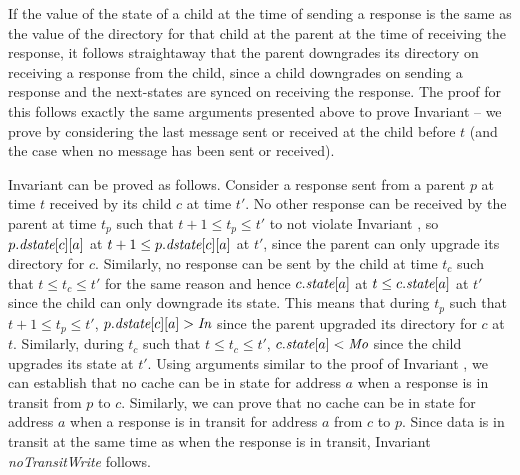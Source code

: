 If the value of the state of a child at the time of sending a response is the
same as the value of the directory for that child at the parent at the time of
receiving the response, it follows straightaway that the parent downgrades its
directory on receiving a response from the child, since a child downgrades on
sending a response and the next-states are synced on receiving the response.
The proof for this follows exactly the same arguments presented above to prove
Invariant  -- we prove by considering the last message
sent or received at the child before $t$ (and the case when no message has been
sent or received).

Invariant  can be proved as follows. Consider a response
sent from a parent $p$ at time $t$ received by its child $c$ at time $t'$. No
other response can be received by the parent at time $t_p$ such that $t+1 \le
t_p \le t'$ to not violate Invariant , so $p.\textit{dstate}[c][a]$ at
$t+1 \le p.\textit{dstate}[c][a]$ at $t'$, since the parent can only upgrade its
directory for $c$. Similarly, no response can be sent by the child at time
$t_c$ such that $t \le t_c \le t'$ for the same reason and hence $c.\textit{state}[a]$
at $t \le c.\textit{state}[a]$ at $t'$ since the child can only downgrade its state.
This means that during $t_p$ such that $t+1 \le t_p \le t'$, $p.\textit{dstate}[c][a]
> \textit{In}$ since the parent upgraded its directory for $c$ at $t$. Similarly,
during $t_c$ such that $t \le t_c \le t'$, $c.\textit{state}[a] < \textit{Mo}$ since the
child upgrades its state at $t'$. Using arguments similar to the proof of
Invariant , we can establish that no cache can be in \Mo{}
state for address $a$ when a response is in transit from $p$ to $c$.
Similarly, we can prove that no cache can be in \Mo{} state for address $a$
when a response is in transit for address $a$ from $c$ to $p$. Since data is in
transit at the same time as when the response is in transit, Invariant
\textit{noTransitWrite} follows.

